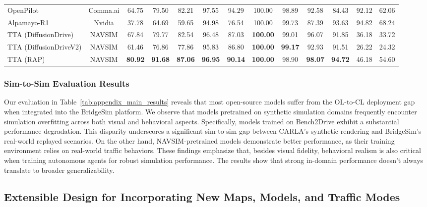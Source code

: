 \documentclass{article}
\begin{document}
\begin{table}[h]
{\begin{tabular}{l|c|c|cc|cccccccc}
\midrule

OpenPilot & Comma.ai & 64.75 & 79.50 & 82.21 & 97.55 & 94.29 & 100.00 & 98.89 & 92.58 & 84.43 & 92.12 & 62.06 \\
Alpamayo-R1 & Nvidia & 37.78 & 64.69 & 59.65 & 94.98 & 76.54 & 100.00 & 99.73 & 87.39 & 93.63 & 94.82 & 68.24 \\

\midrule
\rowcolor{green!15} TTA \scriptsize (DiffusionDrive) & NAVSIM & 67.84 & 79.77 & 82.54 & 96.48 & 87.03 & \textbf{100.00} & 99.01 & 96.07 & 91.85 & 36.18 & 33.72 \\
\rowcolor{green!15} TTA \scriptsize (DiffusionDriveV2) & NAVSIM & 61.46 & 76.86 & 77.86 & 95.83 & 86.80 & \textbf{100.00} & \textbf{99.17} & 92.93 & 91.51 & 26.22 & 24.32 \\
\rowcolor{green!15} TTA \scriptsize (RAP) & NAVSIM & \textbf{80.92} & \textbf{91.68} & \textbf{87.06} & \textbf{96.95} & \textbf{90.14} & \textbf{100.00} & 98.90 & \textbf{98.07} & \textbf{94.72} & 46.18 & 54.60 \\

\bottomrule
\end{tabular}}
\end{table}

\subsubsection{Sim-to-Sim Evaluation Results}
Our evaluation in Table~\ref{tab:appendix_main_results} reveals that most open-source models suffer from the OL-to-CL deployment gap when integrated into the BridgeSim platform. We observe that models pretrained on synthetic simulation domains frequently encounter simulation overfitting across both visual and behavioral aspects. Specifically, models trained on Bench2Drive exhibit a substantial performance degradation. This disparity underscores a significant sim-to-sim gap between CARLA’s synthetic rendering and BridgeSim’s real-world replayed scenarios. On the other hand, NAVSIM-pretrained models demonstrate better performance, as their training environment relies on real-world traffic behaviors. These findings emphasize that, besides visual fidelity, behavioral realism is also critical when training autonomous agents for robust simulation performance. The results show that strong in-domain performance doesn't always translate to broader generalizability.

\subsection{Extensible Design for Incorporating New Maps, Models, and Traffic Modes}
\label{appendix:extensibility}
\end{document}
